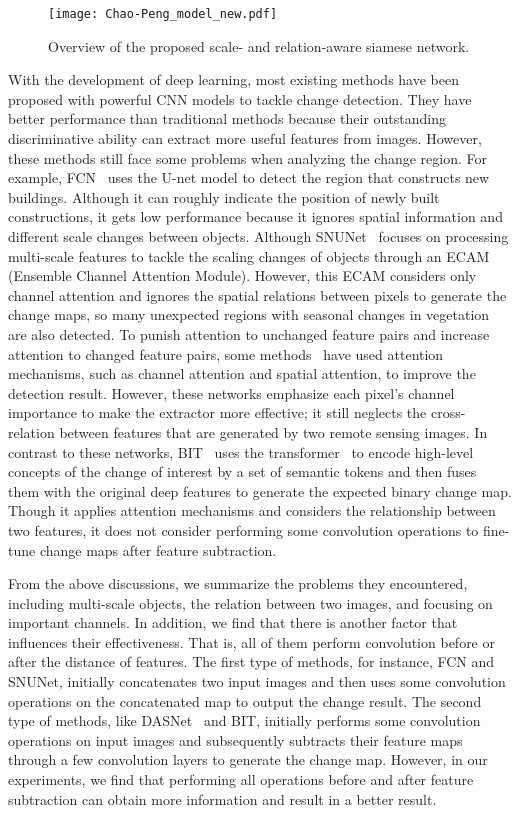 \documentclass[letterpaper]{article} \usepackage{aaai23}  \usepackage{times}  \usepackage{helvet}  \usepackage{courier}  \usepackage[hyphens]{url}  \usepackage{graphicx} \urlstyle{rm} \def\UrlFont{\rm}  \usepackage{natbib}  \usepackage{caption} \frenchspacing  \setlength{\pdfpagewidth}{8.5in}  \setlength{\pdfpageheight}{11in}  \usepackage{algorithm}
\begin{document}
\begin{figure*}[t]
\centering
\texttt{[image: Chao-Peng\_model\_new.pdf]}
\caption{Overview of the proposed scale- and relation-aware siamese network.}
\label{model}
\end{figure*}

With the development of deep learning, most existing methods have been proposed with powerful CNN models to tackle change detection. They have better performance than traditional methods because their outstanding discriminative ability can extract more useful features from images. However, these methods still face some problems when analyzing the change region. For example, FCN~\cite{aaa123} uses the U-net model to detect the region that constructs new buildings. Although it can roughly indicate the position of newly built constructions, it gets low performance because it ignores spatial information and different scale changes between objects. Although SNUNet~\cite{9355573} focuses on processing multi-scale features to tackle the scaling changes of objects through an ECAM (Ensemble Channel Attention Module).  However, this ECAM considers only channel attention and ignores the spatial relations between pixels to generate the change maps, so many unexpected regions with seasonal changes in vegetation are also detected.  To punish attention to unchanged feature pairs and increase attention to changed feature pairs, some methods~\cite{9311793, ZHANG2020183, 9254128} have used attention mechanisms, such as channel attention and spatial attention, to improve the detection result. However, these networks emphasize each pixel's channel importance to make the extractor more effective; it still neglects the cross-relation between features that are generated by two remote sensing images. In contrast to these networks, BIT~\cite{c2022} uses the transformer~\cite{NIPS2017_3f5ee243} to encode high-level concepts of the change of interest by a set of semantic tokens and then fuses them with the original deep features to generate the expected binary change map. Though it applies attention mechanisms and considers the relationship between two features, it does not consider performing some convolution operations to fine-tune change maps after feature subtraction. 

From the above discussions, we summarize the problems they encountered, including multi-scale objects, the relation between two images, and focusing on important channels. In addition, we find that there is another factor that influences their effectiveness. That is, all of them perform convolution before or after the distance of features. The first type of methods, for instance, FCN and SNUNet, initially concatenates two input images and then uses some convolution operations on the concatenated map to output the change result. The second type of methods, like DASNet~\cite{DASNet2021} and BIT, initially performs some convolution operations on input images and subsequently subtracts their feature maps through a few convolution layers to generate the change map. However, in our experiments, we find that performing all operations before and after feature subtraction can obtain more information and result in a better result. 
\end{document}
